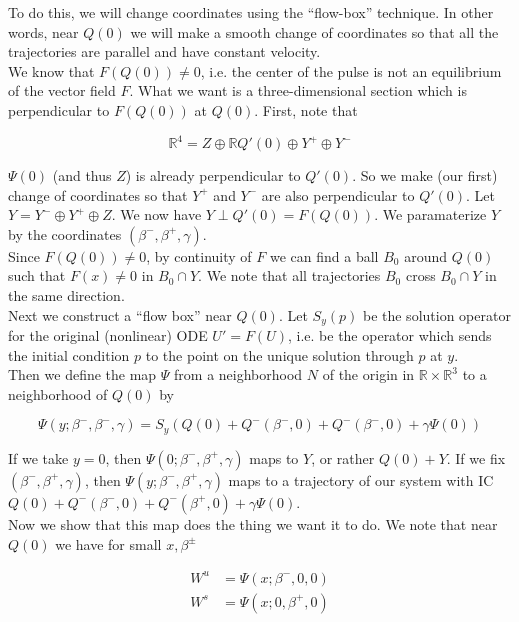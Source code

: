 \documentclass[12pt]{article}
\def\R{{\mathbb R}}
\begin{document}
To do this, we will change coordinates using the ``flow-box'' technique. In other words, near $Q(0)$ we will make a smooth change of coordinates so that all the trajectories are parallel and have constant velocity.\\

We know that $F(Q(0)) \neq 0$, i.e. the center of the pulse is not an equilibrium of the vector field $F$. What we want is a three-dimensional section which is perpendicular to $F(Q(0))$ at $Q(0)$. First, note that

\[
\R^4 = Z \oplus \R Q'(0) \oplus Y^+ \oplus Y^-
\]

$\Psi(0)$ (and thus $Z$) is already perpendicular to $Q'(0)$. So we make (our first) change of coordinates so that $Y^+$ and $Y^-$ are also perpendicular to $Q'(0)$. Let $Y = Y^- \oplus Y^+ \oplus Z$. We now have $Y \perp Q'(0) = F(Q(0))$. We paramaterize $Y$ by the coordinates $(\beta^-, \beta^+, \gamma)$.\\

Since $F(Q(0)) \neq 0$, by continuity of $F$ we can find a ball $B_0$ around $Q(0)$ such that $F(x) \neq 0$ in $B_0 \cap Y$. We note that all trajectories $B_0$ cross $B_0 \cap Y$ in the same direction.\\

Next we construct a ``flow box'' near $Q(0)$. Let $S_y(p)$ be the solution operator for the original (nonlinear) ODE $U' = F(U)$, i.e. be the operator which sends the initial condition $p$ to the point on the unique solution through $p$ at $y$. \\

Then we define the map $\Psi$ from a neighborhood $N$ of the origin in $\R \times \R^3$ to a neighborhood of $Q(0)$ by

\begin{equation}
\Psi(y; \beta^-, \beta^-, \gamma) = S_y(Q(0) + Q^-(\beta^-, 0) + Q^-(\beta^-, 0) + \gamma \Psi(0))
\end{equation}

If we take $y = 0$, then $\Psi(0; \beta^-, \beta^+, \gamma)$ maps to $Y$, or rather $Q(0) + Y$. If we fix $(\beta^-, \beta^+, \gamma)$, then $\Psi(y; \beta^-, \beta^+, \gamma)$ maps to a trajectory of our system with IC $Q(0) + Q^-(\beta^-,0) + Q^-(\beta^+,0)  + \gamma \Psi(0)$.\\ 

Now we show that this map does the thing we want it to do. We note that near $Q(0)$ we have for small $x, \beta^\pm$

\begin{align*}
W^u &= \Psi(x; \beta^-, 0, 0) \\
W^s &= \Psi(x; 0, \beta^+, 0) 
\end{align*}
\end{document}
